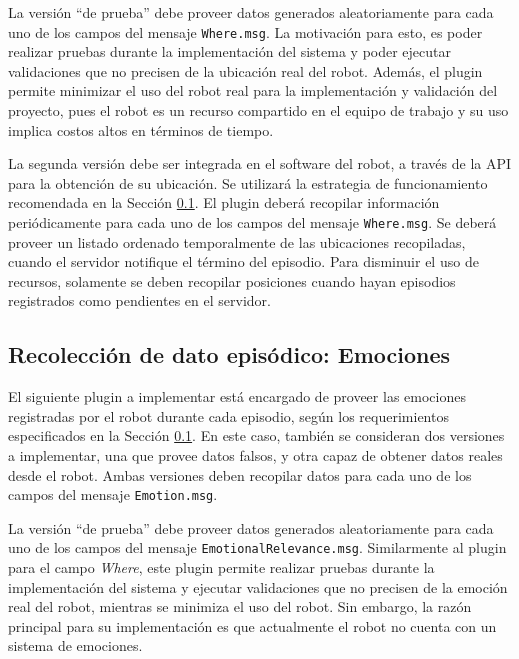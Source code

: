 La versión ``de prueba'' debe proveer datos generados aleatoriamente para cada uno de los campos del mensaje \texttt{Where.msg}. La motivación para esto, es poder realizar pruebas durante la implementación del sistema y poder ejecutar validaciones que no precisen de la ubicación real del robot. Además, el plugin permite minimizar el uso del robot real para la implementación y validación del proyecto, pues el robot es un recurso compartido en el equipo de trabajo y su uso implica costos altos en términos de tiempo.

La segunda versión debe ser integrada en el software del robot, a través de la API para la obtención de su ubicación. Se utilizará la estrategia de funcionamiento recomendada en la Sección \ref{}. El plugin deberá recopilar información periódicamente para cada uno de los campos del mensaje \texttt{Where.msg}. Se deberá proveer un listado ordenado temporalmente de las ubicaciones recopiladas, cuando el servidor notifique el término del episodio. Para disminuir el uso de recursos, solamente se deben recopilar posiciones cuando hayan episodios registrados como pendientes en el servidor.



\subsection{Recolección de dato episódico: Emociones}

El siguiente plugin a implementar está encargado de proveer las emociones registradas por el robot durante cada episodio, según los requerimientos especificados en la Sección \ref{}. En este caso, también se consideran dos versiones a implementar, una que provee datos falsos, y otra capaz de obtener datos reales desde el robot. Ambas versiones deben recopilar datos para cada uno de los campos del mensaje \texttt{Emotion.msg}.

La versión ``de prueba'' debe proveer datos generados aleatoriamente para cada uno de los campos del mensaje \texttt{EmotionalRelevance.msg}. Similarmente al plugin para el campo \textit{Where}, este plugin permite realizar pruebas durante la implementación del sistema y ejecutar validaciones que no precisen de la emoción real del robot, mientras se minimiza el uso del robot. Sin embargo, la razón principal para su implementación es que actualmente el robot no cuenta con un sistema de emociones.

